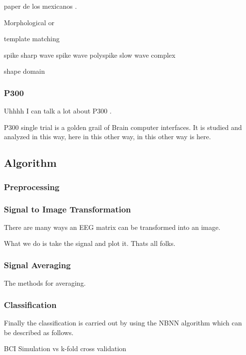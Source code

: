 \documentclass[entropy,article,submit,moreauthors,pdftex,10pt,a4paper]{mdpi}
\begin{document}
paper de los mexicanos \citep{Alvarado-Gonzalez2016}.

Morphological or 

template matching

spike
sharp wave
spike wave
polyspike 
slow wave complex

shape domain




\subsubsection{P300}

Uhhhh I can talk a lot about P300 \citep{Knuth2006}.

P300 single trial is a golden grail of Brain computer interfaces.  It is studied and analyzed in this way, here in this other way, in this other way is here.

\subsection{Algorithm}

\subsubsection{Preprocessing}

\subsubsection{Signal to Image Transformation}

There are many ways an EEG matrix can be transformed into an image.

What we do is take the signal and plot it.  Thats all folks.

\subsubsection{Signal Averaging}

The methods for averaging.

\subsubsection{Classification}

Finally the classification is carried out by using the NBNN algorithm which can be described as follows.

BCI Simulation vs k-fold cross validation
\end{document}
